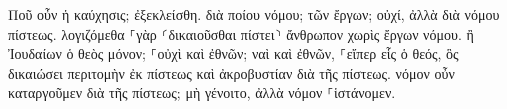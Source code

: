 \documentclass{openreader}
\begin{document}
Ποῦ οὖν ἡ καύχησις; ἐξεκλείσθη. διὰ ποίου νόμου; τῶν ἔργων; οὐχί, ἀλλὰ διὰ νόμου πίστεως. 
λογιζόμεθα ⸀γὰρ ⸂δικαιοῦσθαι πίστει⸃ ἄνθρωπον χωρὶς ἔργων νόμου. 
ἢ Ἰουδαίων ὁ θεὸς μόνον; ⸀οὐχὶ καὶ ἐθνῶν; ναὶ καὶ ἐθνῶν, 
⸀εἴπερ εἷς ὁ θεός, ὃς δικαιώσει περιτομὴν ἐκ πίστεως καὶ ἀκροβυστίαν διὰ τῆς πίστεως. 
νόμον οὖν καταργοῦμεν διὰ τῆς πίστεως; μὴ γένοιτο, ἀλλὰ νόμον ⸀ἱστάνομεν. 
\end{document}
